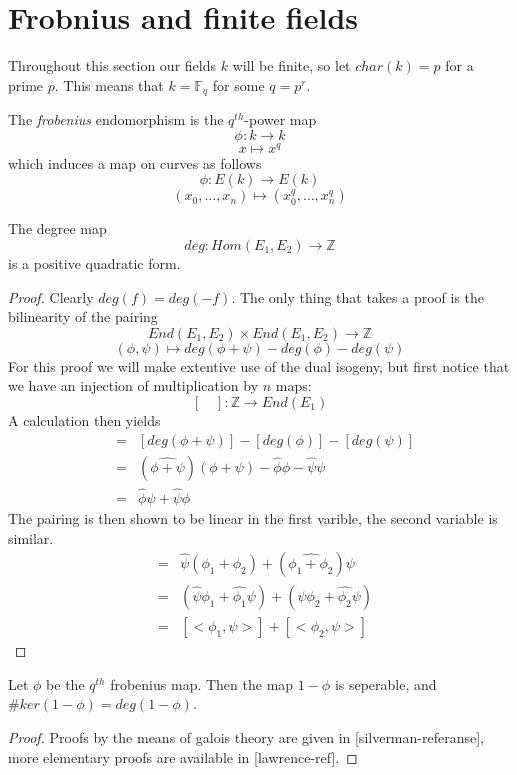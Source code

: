 \section{Frobnius and finite fields}
Throughout this section our fields $k$ will be finite, so let $char(k) = p$ for
a prime $p$. This means that $k = \mathbb{F}_{q}$ for some $q = p^r$.

\begin{mydef}
 The \emph{frobenius} endomorphism is the $q^{th}$-power map
$$ \phi: k \rightarrow k $$
$$ x \mapsto x^q $$
which induces a map on curves as follows
$$ \phi: E(k) \rightarrow E(k) $$
$$ (x_0,\ldots , x_n) \mapsto (x_0^q, \ldots , x_n^q) $$
\end{mydef}

\begin{prop}
 The degree map
$$ deg: Hom(E_1, E_2) \rightarrow \mathbb{Z} $$
is a positive quadratic form.
\end{prop}
\begin{proof}
 Clearly $deg(f) = deg(-f)$. The only thing that takes a proof is the
bilinearity of the pairing
$$ End(E_1, E_2) \times End(E_1, E_2) \rightarrow \mathbb{Z}$$
$$ (\phi, \psi) \mapsto deg(\phi + \psi) - deg(\phi) - deg(\psi) $$
For this proof we will make extentive use of the dual isogeny, but first
notice that we have an injection of multiplication by $n$ maps:
$$ [\quad]: \mathbb{Z} \rightarrow End(E_1) $$
A calculation then yields 
\begin{eqnarray*} 
 [<\phi,\psi>] &=& [deg(\phi+\psi)]-[deg(\phi)]-[deg(\psi)] \nonumber \\
               &=& (\hat{\phi+\psi})(\phi+\psi) - \hat{\phi}\phi - \hat{\psi}\psi \nonumber \\
	       &=& \hat{\phi}\psi + \hat{\psi}\phi
\end{eqnarray*}
The pairing is then shown to be linear in the first varible, the second variable is
similar.
\begin{eqnarray*}
 [<\phi_1+\phi_2, \psi>] &=& \hat{\psi}(\phi_1+\phi_2) + (\hat{\phi_1+\phi_2})\psi \nonumber \\
			 &=& (\hat{\psi}\phi_1+\hat{\phi_1}\psi) + (\hat{\psi}\phi_2 + \hat{\phi_2}\psi) \nonumber \\
			 &=& [<\phi_1,\psi>] + [<\phi_2,\psi>] 
\end{eqnarray*}
\end{proof}

\begin{thm}
 Let $\phi$ be the $q^{th}$ frobenius map. Then the map $1-\phi$ is seperable, and
$\#ker(1-\phi) = deg(1-\phi)$.
\end{thm}
\begin{proof}
 Proofs by the means of galois theory are given in [silverman-referanse], more
elementary proofs are available in [lawrence-ref].
\end{proof}

